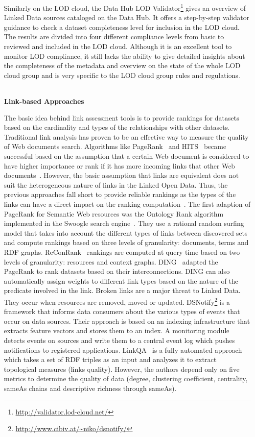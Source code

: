 Similarly on the LOD cloud, the Data Hub LOD Validator\footnote{\url{http://validator.lod-cloud.net/}} gives an overview of Linked Data sources cataloged on the Data Hub. It offers a step-by-step validator guidance to check a dataset completeness level for inclusion in the LOD cloud. The results are divided into four different compliance levels from basic to reviewed and included in the LOD cloud. Although it is an excellent tool to monitor LOD compliance, it still lacks the ability to give detailed insights about the completeness of the metadata and overview on the state of the whole LOD cloud group and is very specific to the LOD cloud group rules and regulations.

\indent \\{\bf Link-based Approaches}

The basic idea behind link assessment tools is to provide rankings for datasets based on the cardinality and types of the relationships with other datasets. Traditional link analysis has proven to be an effective way to measure the quality of Web documents search. Algorithms like PageRank~\cite{Page:TechReport:98} and HITS~\cite{Kleinberg:ACM:99} became successful based on the assumption that a certain Web document is considered to have higher importance or rank if it has more incoming links that other Web documents~\cite{Brin:WWW:98}\cite{Chakrabarti:IEEE:99}. However, the basic assumption that links are equivalent does not suit the heterogeneous nature of links in the Linked Open Data. Thus, the previous approaches fall short to provide reliable rankings as the types of the links can have a direct impact on the ranking computation~\cite{Toupikov:LDOW:09}. The first adaption of PageRank for Semantic Web resources was the Ontology Rank algorithm implemented in the Swoogle search engine~\cite{Ding:CIKM:04}. They use a rational random surfing model that takes into account the different types of links between discovered sets and compute rankings based on three levels of granularity: documents, terms and RDF graphs. ReConRank~\cite{Hogan:SSKB:06} rankings are computed at query time based on two levels of granularity: resources and context graphs. DING~\cite{Toupikov:LDOW:09} adapted the PageRank to rank datasets based on their interconnections. DING can also automatically assign weights to different link types based on the nature of the predicate involved in the link. Broken links are a major threat to Linked Data. They occur when resources are removed, moved or updated. DSNotify\footnote{\url{http://www.cibiv.at/~niko/dsnotify/}}\cite{Haslhofer:IWS:09} is a framework that informs data consumers about the various types of events that occur on data sources. Their approach is based on an indexing infrastructure that extracts feature vectors and stores them to an index. A monitoring module detects events on sources and write them to a central event log which pushes notifications to registered applications. LinkQA~\cite{Gueret:ESWC:12} is a fully automated approach which takes a set of RDF triples as an input and analyzes it to extract topological measures (links quality). However, the authors depend only on five metrics to determine the quality of data (degree, clustering coefficient, centrality, sameAs chains and descriptive richness through sameAs).

